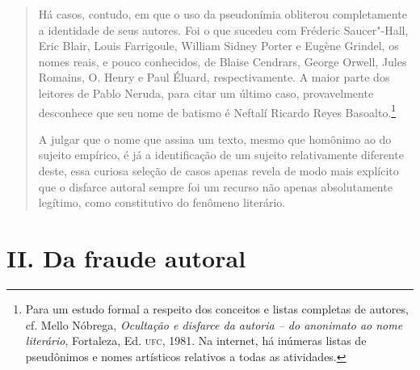 \begin{quote}
Há casos, contudo, em que o uso da pseudonímia obliterou completamente a
identidade de seus autores. Foi o que sucedeu com Fréderic Saucer"-Hall,
Eric Blair, Louis Farrigoule, William Sidney Porter e Eugène Grindel, os
nomes reais, e pouco conhecidos, de Blaise Cendrars, George Orwell,
Jules Romains, O. Henry e Paul Éluard, respectivamente. A maior parte
dos leitores de Pablo Neruda, para citar um último caso, provavelmente
desconhece que seu nome de batismo é Neftalí Ricardo Reyes
Basoalto.\footnote{Para um estudo formal a respeito dos conceitos e
  listas completas de autores, cf. Mello Nóbrega, \emph{Ocultação e
  disfarce da autoria -- do anonimato ao nome literário}, Fortaleza, Ed.
  \textsc{ufc}, 1981. Na internet, há inúmeras listas de pseudônimos e
  nomes artísticos relativos a todas as atividades.}

A julgar que o nome que assina um texto, mesmo que homônimo ao do
sujeito empírico, é já a identificação de um sujeito relativamente
diferente deste, essa curiosa seleção de casos apenas revela de modo
mais explícito que o disfarce autoral sempre foi um recurso não apenas
absolutamente legítimo, como constitutivo do fenômeno literário.
\end{quote}

\section*{II. Da fraude autoral}

